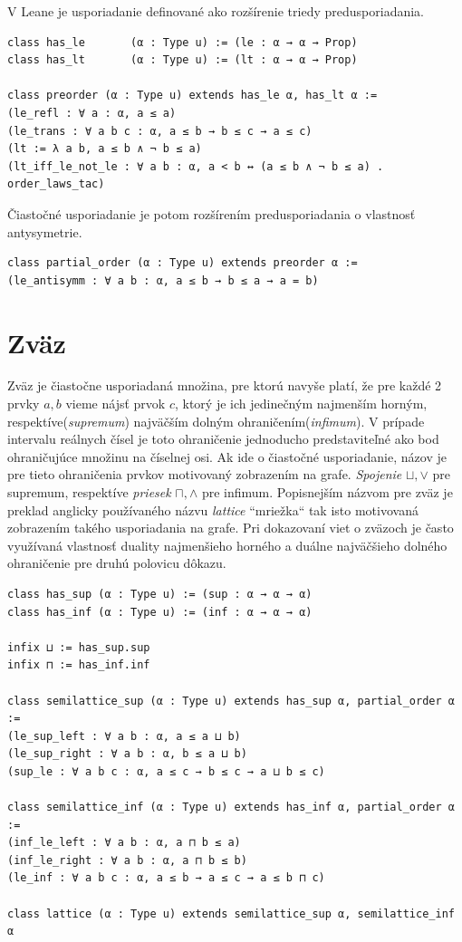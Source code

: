 \documentclass[a4paper,10pt,oneside]{report}%
\begin{document}
    V Leane je usporiadanie definované ako rozšírenie triedy predusporiadania.
\begin{lstlisting}
class has_le       (α : Type u) := (le : α → α → Prop)
class has_lt       (α : Type u) := (lt : α → α → Prop)

class preorder (α : Type u) extends has_le α, has_lt α :=
(le_refl : ∀ a : α, a ≤ a)
(le_trans : ∀ a b c : α, a ≤ b → b ≤ c → a ≤ c)
(lt := λ a b, a ≤ b ∧ ¬ b ≤ a)
(lt_iff_le_not_le : ∀ a b : α, a < b ↔ (a ≤ b ∧ ¬ b ≤ a) . order_laws_tac)
\end{lstlisting}
    Čiastočné usporiadanie je potom rozšírením predusporiadania o vlastnosť antysymetrie.
\begin{lstlisting}
class partial_order (α : Type u) extends preorder α :=
(le_antisymm : ∀ a b : α, a ≤ b → b ≤ a → a = b)
\end{lstlisting}

\section{Zväz}
    Zväz je čiastočne usporiadaná množina, pre ktorú navyše platí, že pre každé 2 prvky $a, b$
vieme nájsť prvok $c$, ktorý je ich jedinečným najmenším horným, respektíve(\emph{supremum})
najväčším dolným ohraničením(\emph{infimum}).
    V prípade intervalu reálnych čísel je toto ohraničenie jednoducho predstaviteľné
ako bod ohraničujúce množinu na číselnej osi.
    Ak ide o čiastočné usporiadanie, názov je pre tieto ohraničenia prvkov
motivovaný zobrazením na grafe.
    \emph{Spojenie} $\sqcup, \vee$ pre supremum, respektíve \emph{priesek} $\sqcap, \wedge$ pre infimum.
    Popisnejším názvom pre zväz je preklad anglicky používaného názvu \emph{lattice}
``mriežka`` tak isto motivovaná zobrazením takého usporiadania na grafe.
    Pri dokazovaní viet o zväzoch je často využívaná vlastnosť duality najmenšieho
horného a duálne najväčšieho dolného ohraničenie pre druhú polovicu dôkazu.
\begin{lstlisting}
class has_sup (α : Type u) := (sup : α → α → α)
class has_inf (α : Type u) := (inf : α → α → α)

infix ⊔ := has_sup.sup
infix ⊓ := has_inf.inf

class semilattice_sup (α : Type u) extends has_sup α, partial_order α :=
(le_sup_left : ∀ a b : α, a ≤ a ⊔ b)
(le_sup_right : ∀ a b : α, b ≤ a ⊔ b)
(sup_le : ∀ a b c : α, a ≤ c → b ≤ c → a ⊔ b ≤ c)

class semilattice_inf (α : Type u) extends has_inf α, partial_order α :=
(inf_le_left : ∀ a b : α, a ⊓ b ≤ a)
(inf_le_right : ∀ a b : α, a ⊓ b ≤ b)
(le_inf : ∀ a b c : α, a ≤ b → a ≤ c → a ≤ b ⊓ c)

class lattice (α : Type u) extends semilattice_sup α, semilattice_inf α
\end{lstlisting}
\end{document}
